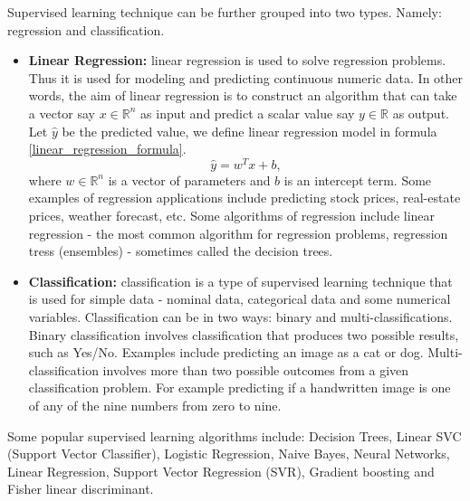 \documentclass[master]{thesis-uestc}
\begin{document}
Supervised learning technique can be further grouped into two types. Namely: regression and classification.
\begin{itemize}
    \item\textbf{Linear Regression:} linear regression is used to solve regression problems. Thus it is used for modeling and predicting continuous numeric data. In other words, the aim of linear regression is to construct an algorithm that can take a vector say $x \in \mathbb{R}^n$ as input and predict a scalar value say $y \in  \mathbb{R}$ as output. Let $\hat{y}$ be the predicted value, we define linear regression model in formula \ref{linear_regression_formula}.
    \begin{equation}
        \hat{y} = w^Tx + b,
    \label{linear_regression_formula}
    \end{equation}
    where $w \in \mathbb{R}^n$ is a vector of parameters and $b$ is an intercept term. Some examples of regression applications include predicting stock prices, real-estate prices, weather forecast, etc. Some algorithms of regression include linear regression - the most common algorithm for regression problems, regression tress (ensembles) - sometimes called the decision trees.
    \item\textbf{Classification:} classification is a type of supervised learning technique that is used for simple data - nominal data, categorical data and some numerical variables. Classification can be in two ways: binary and multi-classifications. Binary classification involves classification that produces two possible results, such as Yes/No. Examples include predicting an image as a cat or dog. Multi-classification involves more than two possible outcomes from a given classification problem. For example predicting if a handwritten image is one of any of the nine numbers from zero to nine. 
\end{itemize}
Some popular supervised learning algorithms include: Decision Trees, Linear SVC (Support Vector Classifier), Logistic Regression, Naive Bayes, Neural Networks, Linear Regression, Support Vector Regression (SVR), Gradient boosting and Fisher linear discriminant. 
\end{document}
